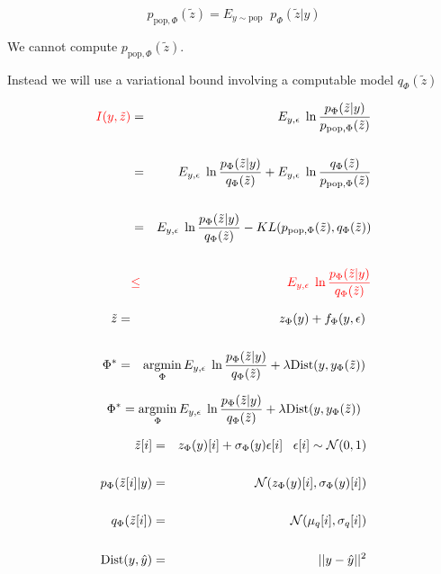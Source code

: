 {

$$p_{\mathrm{pop},\Phi}(\tilde{z})  = E_{y\sim \mathrm{pop}}\;\;p_\Phi(\tilde{z}|y)$$

\vfill
We cannot compute $p_{\mathrm{pop},\Phi}(\tilde{z})$.

\vfill
Instead we will use a variational bound involving a computable model $q_\Phi(\tilde{z})$


\begin{eqnarray*}
{\color{red} I(y,\tilde{z})}  & = & E_{y,\epsilon}\;\ln \frac{p_\Phi(\tilde{z}|y)}{p_{\mathrm{pop},\Phi}(\tilde{z})} \\
\\
& = & E_{y,\epsilon}\;\ln \frac{p_\Phi(\tilde{z}|y)}{q_\Phi(\tilde{z})} + E_{y,\epsilon}\;\ln\frac{q_\Phi(\tilde{z})}{p_{\mathrm{pop},\Phi}(\tilde{z})} \\
\\
& = & E_{y,\epsilon}\;\ln \frac{p_\Phi(\tilde{z}|y)}{q_\Phi(\tilde{z})} - KL(p_{\mathrm{pop},\Phi}(\tilde{z}),q_\Phi(\tilde{z})) \\
\\
& {\color{red} \leq} & {\color{red} E_{y,\epsilon}\;\ln \frac{p_\Phi(\tilde{z}|y)}{q_\Phi(\tilde{z})}}
\end{eqnarray*}


\begin{eqnarray*}
\tilde{z} & = & z_\Phi(y) + f_\Phi(y,\epsilon) \\
\\
\Phi^* & = & \operatorname*{argmin}_\Phi E_{y,\epsilon}\;\ln \frac{p_\Phi(\tilde{z}|y)}{q_\Phi(\tilde{z})} + \lambda \mathrm{Dist}(y,y_\Phi(\tilde{z}))
\end{eqnarray*}

$$\Phi^* = \operatorname*{argmin}_\Phi E_{y,\epsilon}\;\ln \frac{p_\Phi(\tilde{z}|y)}{q_\Phi(\tilde{z})} + \lambda \mathrm{Dist}(y,y_\Phi(\tilde{z}))$$

{\color{red}
\begin{eqnarray*}
\tilde{z}[i] & = & z_\Phi(y)[i] + \sigma_\Phi(y)\epsilon[i]\;\;\;\epsilon[i] \sim {\cal N}(0,1) \\
\\
p_\Phi(\tilde{z}[i]|y) & = & {\cal N}(z_\Phi(y)[i],\sigma_\Phi(y)[i]) \\
\\
q_\Phi(\tilde{z}[i]) & = & {\cal N}(\mu_q[i],\sigma_q[i]) \\
\\
\mathrm{Dist}(y,\hat{y}) & = & ||y-\hat{y}||^2
\end{eqnarray*}
}

}
